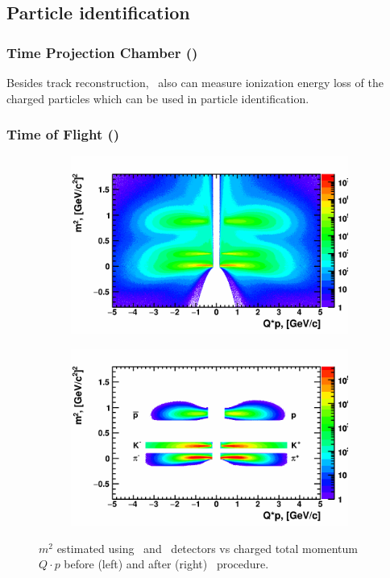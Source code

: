 \FloatBarrier
\subsection {Particle identification}

\FloatBarrier
\subsubsection{Time Projection Chamber (\TPC)}

Besides track reconstruction, \TPC\ also can measure ionization energy loss of the charged particles which can be used in particle identification.

\FloatBarrier
\subsubsection{Time of Flight (\TOF)}

\begin{figure}[ht]
    \begin{subfigure}{.49\textwidth}
        \centering
        \includegraphics[width=1.\linewidth]{Figures/M2Qp_before_PID.png}
    \end{subfigure}
    \begin{subfigure}{.49\textwidth}
        \centering
        \includegraphics[width=1.\linewidth]{Figures/M2Qp_after_PID.png}
    \end{subfigure}
    \label{fig:M2vsQp}
    \caption{$m^2$ estimated using \TPC\ and \TOF\ detectors vs charged total momentum $Q\cdot p$ before (left) and after (right) \PID\ procedure.}
\end{figure}